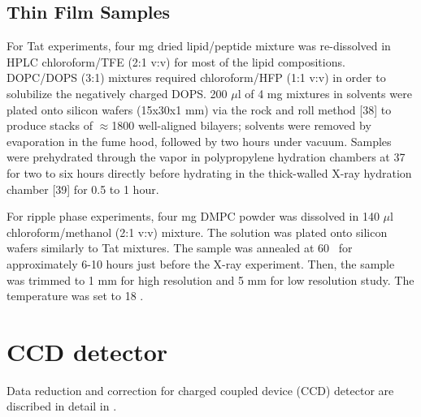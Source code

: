 \subsection{Thin Film Samples}

For Tat experiments, four mg dried lipid/peptide mixture was re-dissolved in HPLC chloroform/TFE 
(2:1 v:v)
for most of the lipid compositions. 
DOPC/DOPS (3:1) mixtures required
chloroform/HFP (1:1 v:v) in order to solubilize the negatively charged DOPS. 
200 $\mu$l of 4 mg
mixtures in solvents were plated onto silicon wafers (15x30x1 mm) via the rock 
and roll method
[38] to produce stacks of $\approx$1800 well-aligned bilayers; 
solvents were removed by 
evaporation in
the fume hood, followed by two hours under vacuum. Samples were prehydrated 
through the
vapor in polypropylene hydration chambers at 37 \degC for two to six hours 
directly before hydrating in the
thick-walled X-ray hydration chamber [39] for 0.5 to 1 hour. 

For ripple phase experiments, four mg DMPC powder was dissolved in 
140 $\mu$l chloroform/methanol (2:1 v:v) mixture. The solution was
plated onto silicon wafers similarly to Tat mixtures. 
The sample was annealed at 60 \textcelsius\ for approximately
6-10 hours just before the X-ray experiment. 
Then, the sample was trimmed to 1 mm for high
resolution and 5 mm for low resolution study. The temperature
was set to 18 \textcelsius. 

\section{CCD detector}
Data reduction and correction for charged coupled device (CCD) detector
are discribed in detail in \cite{ref:Burner}.
